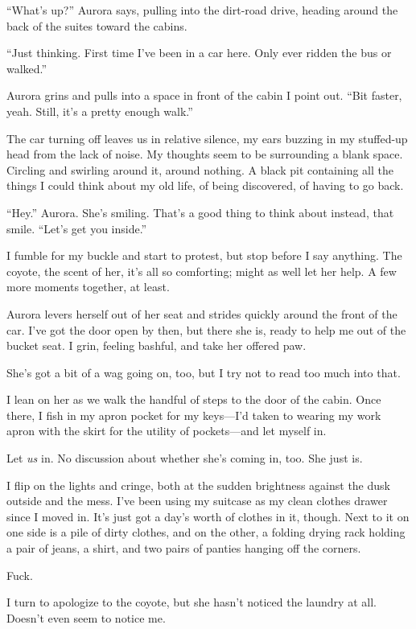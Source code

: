 ``What's up?'' Aurora says, pulling into the dirt-road drive, heading around the back of the suites toward the cabins.

``Just thinking. First time I've been in a car here. Only ever ridden the bus or walked.''

Aurora grins and pulls into a space in front of the cabin I point out. ``Bit faster, yeah. Still, it's a pretty enough walk.''

The car turning off leaves us in relative silence, my ears buzzing in my stuffed-up head from the lack of noise. My thoughts seem to be surrounding a blank space. Circling and swirling around it, around nothing. A black pit containing all the things I could think about my old life, of being discovered, of having to go back.

``Hey.'' Aurora. She's smiling. That's a good thing to think about instead, that smile. ``Let's get you inside.''

I fumble for my buckle and start to protest, but stop before I say anything. The coyote, the scent of her, it's all so comforting; might as well let her help. A few more moments together, at least.

Aurora levers herself out of her seat and strides quickly around the front of the car. I've got the door open by then, but there she is, ready to help me out of the bucket seat. I grin, feeling bashful, and take her offered paw.

She's got a bit of a wag going on, too, but I try not to read too much into that.

I lean on her as we walk the handful of steps to the door of the cabin. Once there, I fish in my apron pocket for my keys---I'd taken to wearing my work apron with the skirt for the utility of pockets---and let myself in.

Let \emph{us} in. No discussion about whether she's coming in, too. She just is.

I flip on the lights and cringe, both at the sudden brightness against the dusk outside and the mess. I've been using my suitcase as my clean clothes drawer since I moved in. It's just got a day's worth of clothes in it, though. Next to it on one side is a pile of dirty clothes, and on the other, a folding drying rack holding a pair of jeans, a shirt, and two pairs of panties hanging off the corners.

Fuck.

I turn to apologize to the coyote, but she hasn't noticed the laundry at all. Doesn't even seem to notice me.

